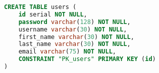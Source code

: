 \begin{lstlisting}[language=SQL,caption={Table creation \acrshort{sql} command},breaklines=true,label={lst:sqlCreateTable}]
CREATE TABLE users (
    id serial NOT NULL,
    password varchar(128) NOT NULL,
    username varchar(30) NOT NULL,
    first_name varchar(30) NOT NULL,
    last_name varchar(30) NOT NULL,
    email varchar(75) NOT NULL,
    CONSTRAINT "PK_users" PRIMARY KEY (id)
)
\end{lstlisting}
